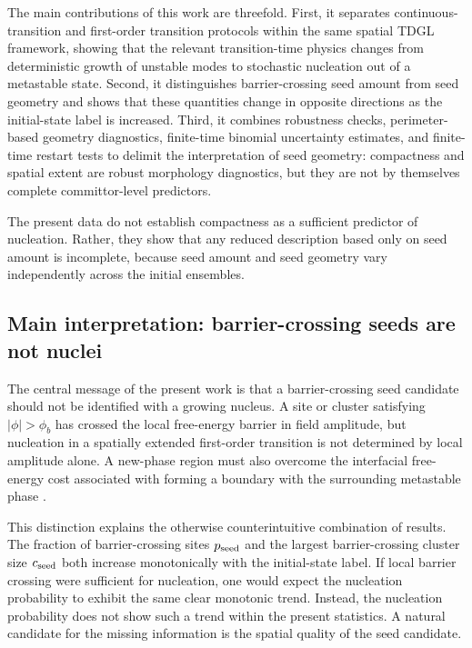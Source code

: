 ﻿\documentclass[aps,pre,preprint,showkeys,amsmath,amssymb,superscriptaddress,longbibliography]{revtex4-2}
\begin{document}
The main contributions of this work are threefold. First, it separates continuous-transition and first-order transition protocols within the same spatial TDGL framework, showing that the relevant transition-time physics changes from deterministic growth of unstable modes to stochastic nucleation out of a metastable state. Second, it distinguishes barrier-crossing seed amount from seed geometry and shows that these quantities change in opposite directions as the initial-state label is increased. Third, it combines robustness checks, perimeter-based geometry diagnostics, finite-time binomial uncertainty estimates, and finite-time restart tests to delimit the interpretation of seed geometry: compactness and spatial extent are robust morphology diagnostics, but they are not by themselves complete committor-level predictors.

The present data do not establish compactness as a sufficient predictor of nucleation. Rather, they show that any reduced description based only on seed amount is incomplete, because seed amount and seed geometry vary independently across the initial ensembles.



\subsection{Main interpretation: barrier-crossing seeds are not nuclei}\label{main-interpretation-barrier-crossing-seeds-are-not-nuclei}

The central message of the present work is that a barrier-crossing seed candidate should not be identified with a growing nucleus. A site or cluster satisfying $|\phi|>\phi_b$ has crossed the local free-energy barrier in field amplitude, but nucleation in a spatially extended first-order transition is not determined by local amplitude alone. A new-phase region must also overcome the interfacial free-energy cost associated with forming a boundary with the surrounding metastable phase \cite{Langer1969}.

This distinction explains the otherwise counterintuitive combination of results. The fraction of barrier-crossing sites $p_{\rm seed}$ and the largest barrier-crossing cluster size $c_{\rm seed}$ both increase monotonically with the initial-state label. If local barrier crossing were sufficient for nucleation, one would expect the nucleation probability to exhibit the same clear monotonic trend. Instead, the nucleation probability does not show such a trend within the present statistics. A natural candidate for the missing information is the spatial quality of the seed candidate.
\end{document}
